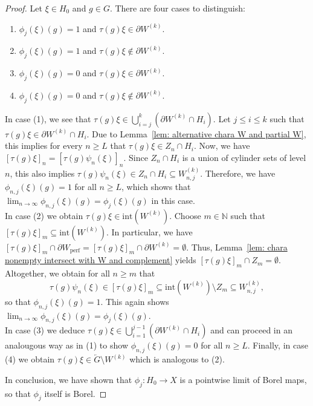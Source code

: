 \documentclass[titlepage,reqno,10pt]{amsart}
\theoremstyle{definition}
\def\N{{\mathbb N}}
\newcommand{\tm}{\subseteq}
\begin{document}
\begin{proof}
Let $\xi\in H_0$ and $g\in G$.
There are four cases to distinguish:
\begin{enumerate}
    \item $\phi_j(\xi)(g)=1$ and $\tau(g)\xi \in \partial W^{(k)}$.
    \item $\phi_j(\xi)(g)= 1 $ and $\tau(g) \xi\notin \partial W^{(k)}$.
    \item $\phi_j(\xi)(g)=0$ and $\tau(g)\xi \in \partial W^{(k)}$. 
    \item $\phi_j(\xi)(g)=0$ and $\tau(g)\xi\notin \partial W^{(k)}$.
\end{enumerate}
In case (1), we see that $\tau(g)\xi \in \bigcup_{i=j}^k(\partial W^{(k)} \cap H_i)$.
Let $j\leq i \leq k$ such that $\tau(g)\xi \in \partial W^{(k)}\cap H_i$.
Due to Lemma~\ref{lem: alternative chara W and partial W}, this implies for every $n\geq L$ that $\tau(g)\xi\in Z_n \cap H_i$.
Now, we have $[\tau(g)\xi]_n = [\tau(g)\psi_n(\xi)]_n$.
Since $Z_n\cap H_i$ is a union of cylinder sets of level $n$, this also implies $\tau(g) \psi_n(\xi) \in Z_n\cap H_i \tm W_{n,j}^{(k)}$.
Therefore, we have $\phi_{n,j}(\xi)(g) = 1$ for all $n\geq L$, which shows that $\lim_{n\to \infty}\phi_{n,j}(\xi)(g)=\phi_j(\xi)(g)$ in this case.\\
In case (2) we obtain $\tau(g)\xi \in \mathrm{int}(W^{(k)})$.
Choose $m\in \N$ such that $[\tau(g)\xi]_m\tm \mathrm{int}(W^{(k)})$.
In particular, we have $[\tau(g)\xi]_m\cap \partial W_{\mathrm{perf}} = [\tau(g)\xi]_m \cap \partial W^{(k)} = \emptyset$.
Thus, Lemma~\ref{lem: chara nonempty intersect with W and complement} yields $[\tau(g)\xi]_m\cap Z_m=\emptyset$.
Altogether, we obtain for all $n\geq m$ that 
$$ \tau(g)\psi_n(\xi) \in [\tau(g)\xi]_m \tm \mathrm{int}(W^{(k)}) \setminus Z_m \tm W_{n,j}^{(k)},$$
so that $\phi_{n,j}(\xi)(g) = 1$. This again shows $\lim_{n\to \infty}\phi_{n,j}(\xi)(g)=\phi_j(\xi)(g)$.\\
In case (3) we deduce $\tau(g)\xi\in \bigcup_{i=1}^{j-1}(\partial W^{(k)}\cap H_i)$ and can proceed in an analougous way as in (1) to show $\phi_{n,j}(\xi)(g) = 0$ for all $n\geq L$. Finally, in case (4) we obtain $\tau(g)\xi \in \overleftarrow{G}\setminus W^{(k)}$ which is analogous to (2).

In conclusion, we have shown that $\phi_j:H_0\to X$ is a pointwise limit of Borel maps, so that $\phi_j$ itself is Borel.
\end{proof}
\end{document}
